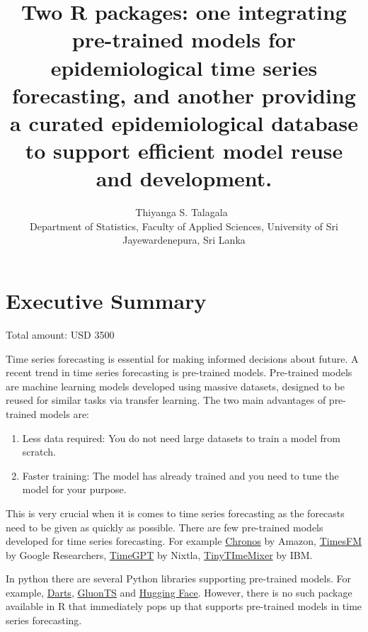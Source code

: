 \documentclass[
]{article}
\title{Two R packages: one integrating pre-trained models for
epidemiological time series forecasting, and another providing a curated
epidemiological database to support efficient model reuse and
development.}
\author{
{\large Thiyanga S. Talagala~\orcidlink{0000-0002-0656-9789}}%
 \\%
Department of Statistics, Faculty of Applied Sciences, University of Sri
Jayewardenepura, Sri Lanka \\%
{\footnotesize \url{}} \and
}
\date{}
\newcommand{\published}[1]{%
   \gdef\puB{#1}}
\newcommand{\puB}{}
\begin{document}
\published{\textbf{2026-04-30}}

\maketitle






\section{Executive Summary}\label{executive-summary}

Total amount: USD 3500

Time series forecasting is essential for making informed decisions about
future. A recent trend in time series forecasting is pre-trained models.
Pre-trained models are machine learning models developed using massive
datasets, designed to be reused for similar tasks via transfer learning.
The two main advantages of pre-trained models are:

\begin{enumerate}
\def\labelenumi{\arabic{enumi}.}
\item
  Less data required: You do not need large datasets to train a model
  from scratch.
\item
  Faster training: The model has already trained and you need to tune
  the model for your purpose.
\end{enumerate}

This is very crucial when it is comes to time series forecasting as the
forecasts need to be given as quickly as possible. There are few
pre-trained models developed for time series forecasting. For example
\href{https://github.com/amazon-science/chronos-forecasting}{Chronos} by
Amazon, \href{https://github.com/google-research/timesfm}{TimesFM} by
Google Researchers, \href{https://github.com/Nixtla/nixtla}{TimeGPT} by
Nixtla,
\href{https://developer.ibm.com/tutorials/awb-foundation-model-time-series-forecasting/}{TinyTImeMixer}
by IBM.

In python there are several Python libraries supporting pre-trained
models. For example, \href{https://unit8co.github.io/darts/}{Darts},
\href{https://ts.gluon.ai/stable/}{GluonTS} and
\href{https://huggingface.co/models?other=time-series}{Hugging Face}.
However, there is no such package available in R that immediately pops
up that supports pre-trained models in time series forecasting.
\end{document}
